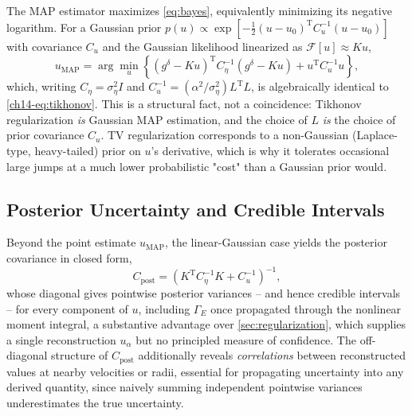 The MAP estimator maximizes \cref{eq:bayes}, equivalently minimizing its negative logarithm. For a Gaussian prior $p(u) \propto \exp[-\tfrac{1}{2}(u-u_0)^{\mathrm{T}} C_{u}^{-1} (u-u_0)]$ with covariance $C_u$ and the Gaussian likelihood linearized as $\mathcal{F}[u] \approx Ku$,
\begin{equation}
u_{\mathrm{MAP}} = \arg\min_{u} \left\{ \left( g^{\delta} - Ku \right)^{\mathrm{T}} C_{\eta}^{-1} \left( g^{\delta} - Ku \right) + u^{\mathrm{T}} C_{u}^{-1} u \right\},
\label{eq:map}
\end{equation}
which, writing $C_{\eta} = \sigma_{\eta}^{2} I$ and $C_{u}^{-1} = (\alpha^2/\sigma_\eta^2) L^{\mathrm{T}}L$, is algebraically identical to \cref{ch14-eq:tikhonov}. This is a structural fact, not a coincidence: Tikhonov regularization \emph{is} Gaussian MAP estimation, and the choice of $L$ \emph{is} the choice of prior covariance $C_u$. TV regularization corresponds to a non-Gaussian (Laplace-type, heavy-tailed) prior on $u$'s derivative, which is why it tolerates occasional large jumps at a much lower probabilistic "cost" than a Gaussian prior would.

\subsection{Posterior Uncertainty and Credible Intervals}

Beyond the point estimate $u_{\mathrm{MAP}}$, the linear-Gaussian case yields the posterior covariance in closed form,
\begin{equation}
C_{\mathrm{post}} = \left( K^{\mathrm{T}} C_{\eta}^{-1} K + C_{u}^{-1} \right)^{-1},
\label{ch14-eq:posterior-cov}
\end{equation}
whose diagonal gives pointwise posterior variances -- and hence credible intervals -- for every component of $u$, including $\Gamma_{E}$ once propagated through the nonlinear moment integral, a substantive advantage over \cref{sec:regularization}, which supplies a single reconstruction $u_{\alpha}$ but no principled measure of confidence. The off-diagonal structure of $C_{\mathrm{post}}$ additionally reveals \emph{correlations} between reconstructed values at nearby velocities or radii, essential for propagating uncertainty into any derived quantity, since naively summing independent pointwise variances underestimates the true uncertainty.

